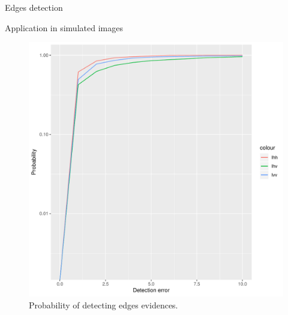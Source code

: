 \documentclass[10pt,professionalfonts]{beamer}
\begin{document}
\begin{frame}[fragile]{Edges detection}
\begin{alertblock}{Application in simulated images} 
	\begin{figure}[hbt]
	\centering
	\includegraphics[width=.6\linewidth]{metricas_ihh_ivh_ivv_nhfc_artigos}%
	\caption{Probability of detecting edges evidences.}
\label{fig4}
\end{figure}
\end{alertblock}
\end{frame}
\end{document}

